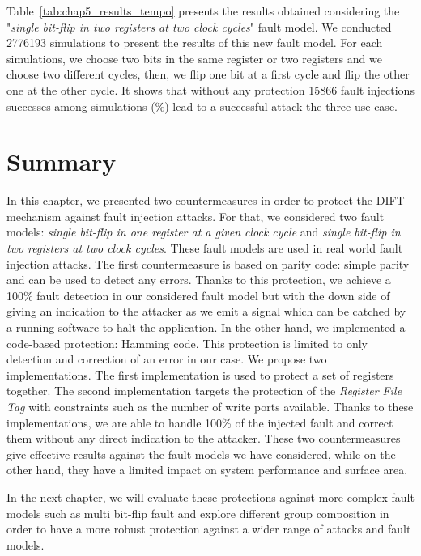 Table~\ref{tab:chap5_results_tempo} presents the results obtained considering the "\textit{single bit-flip in two registers at two clock cycles}" fault model.  We conducted \num{2776193} simulations to present the results of this new fault model. For each simulations, we choose two bits in the same register or two registers and we choose two different cycles, then, we flip one bit at a first cycle and flip the other one at the other cycle.
It shows that without any protection \num{15866} fault injections successes among  simulations (\%) lead to a successful attack the three use case.


\section{Summary}
In this chapter, we presented two countermeasures in order to protect the DIFT mechanism against fault injection attacks. For that, we considered two fault models: \textit{single bit-flip in one register at a given clock cycle} and \textit{single bit-flip in two registers at two clock cycles}. These fault models are used in real world fault injection attacks.
The first countermeasure is based on parity code: simple parity and can be used to detect any errors. Thanks to this protection, we achieve a 100\% fault detection in our considered fault model but with the down side of giving an indication to the attacker as we emit a signal which can be catched by a running software to halt the application. In the other hand, we implemented a code-based protection: Hamming code. This protection is limited to only detection and correction of an error in our case. We propose two implementations. The first implementation is used to protect a set of registers together. The second implementation targets the protection of the \textit{Register File Tag} with constraints such as the number of write ports available. Thanks to these implementations, we are able to handle 100\% of the injected fault and correct them without any direct indication to the attacker.
These two countermeasures give effective results against the fault models we have considered, while on the other hand, they have a limited impact on system performance and surface area.

In the next chapter, we will evaluate these protections against more complex fault models such as multi bit-flip fault and explore different group composition in order to have a more robust protection against a wider range of attacks and fault models.

